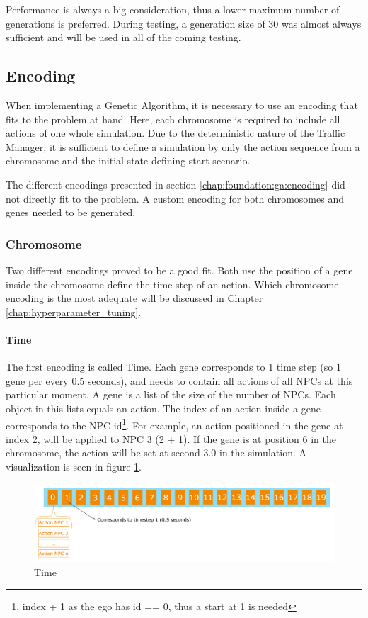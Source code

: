 Performance is always a big consideration, thus a lower maximum number of generations is preferred. During testing, a generation size of 30 was almost always sufficient and will be used in all of the coming testing.

\subsection{Encoding}
When implementing a Genetic Algorithm, it is necessary to use an encoding that fits to the problem at hand. 
Here, each chromosome is required to include all actions of one whole simulation. Due to the deterministic nature of the Traffic Manager, it is sufficient to define a simulation by only the action sequence from a chromosome and the initial state defining start scenario.

The different encodings presented in section \ref{chap:foundation:ga:encoding} did not directly fit to the problem. A custom encoding for both chromosomes and genes needed to be generated.

\subsubsection{Chromosome}
Two different encodings proved to be a good fit. Both use the position of a gene inside the chromosome define the time step of an action. Which chromosome encoding is the most adequate will be discussed in Chapter \ref{chap:hyperparameter_tuning}.

\paragraph{Time}
The first encoding is called Time. Each gene corresponds to 1 time step (so 1 gene per every 0.5 seconds), and needs to contain all actions of all NPCs at this particular moment. A gene is a list of the size of the number of NPCs. Each object in this lists equals an action. The index of an action inside a gene corresponds to the NPC id\footnote{index + 1 as the ego has id == 0, thus a start at 1 is needed}. For example, an action positioned in the gene at index 2, will be applied to NPC 3 (2 + 1). If the gene is at position 6 in the chromosome, the action will be set at second 3.0 in the simulation. A visualization is seen in figure \ref{figure:encoding:chromosome:time}.

\begin{figure}[ht] 
	\includegraphics[width=1\linewidth]{figures/time_encoding}
	\caption{Time}
	\label{figure:encoding:chromosome:time}
\end{figure}


